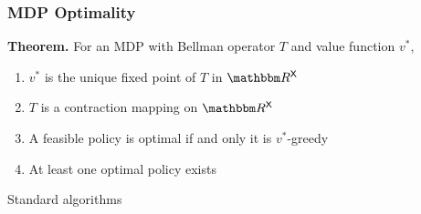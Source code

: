 \documentclass[dvipsnames]{beamer}
\begin{document}
\begin{frame}
    \frametitle{MDP Optimality}

    \begin{block}{\vspace*{-3ex}}
        {\bf Theorem.} For an MDP with Bellman operator
        $T$ and value function $v^*$,
            \vspace{0.5em}
        \begin{enumerate}
            \item $v^*$ is the unique fixed point of $T$
                in $\RR^\Xsf$
            \vspace{0.5em}
            \vspace{0.5em}
            \item $T$ is a contraction mapping on $\RR^\Xsf$
            \vspace{0.5em}
            \vspace{0.5em}
            \item A feasible policy is optimal if and only it is $v^*$-greedy
            \vspace{0.5em}
            \vspace{0.5em}
            \item At least one optimal policy exists
        \end{enumerate}
    \end{block}


\end{frame}

\begin{frame}
    
    Standard algorithms

\end{frame}
\end{document}
